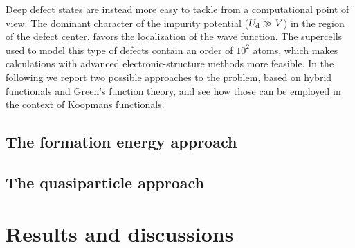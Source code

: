 Deep defect states are instead more easy to tackle from a computational point of view. The dominant character of the impurity potential ($U_{\rm d} \gg V$) in the region of the defect center, favors the localization of the wave function. The supercells used to model this type of defects contain an order of $10^2$ atoms, which makes calculations with advanced electronic-structure methods more feasible. In the following we report two possible approaches to the problem, based on hybrid functionals and Green's function theory, and see how those can be employed in the context of Koopmans functionals.

\subsection{The formation energy approach}

\subsection{The quasiparticle approach}

\section{Results and discussions}





